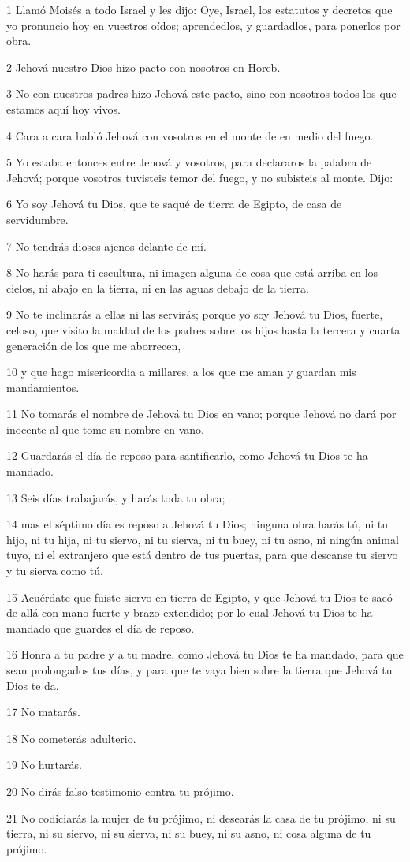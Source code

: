 \par 1 Llamó Moisés a todo Israel y les dijo: Oye, Israel, los estatutos y decretos que yo pronuncio hoy en vuestros oídos; aprendedlos, y guardadlos, para ponerlos por obra.
\par 2 Jehová nuestro Dios hizo pacto con nosotros en Horeb.
\par 3 No con nuestros padres hizo Jehová este pacto, sino con nosotros todos los que estamos aquí hoy vivos.
\par 4 Cara a cara habló Jehová con vosotros en el monte de en medio del fuego.
\par 5 Yo estaba entonces entre Jehová y vosotros, para declararos la palabra de Jehová; porque vosotros tuvisteis temor del fuego, y no subisteis al monte. Dijo:
\par 6 Yo soy Jehová tu Dios, que te saqué de tierra de Egipto, de casa de servidumbre.
\par 7 No tendrás dioses ajenos delante de mí.
\par 8 No harás para ti escultura, ni imagen alguna de cosa que está arriba en los cielos, ni abajo en la tierra, ni en las aguas debajo de la tierra.
\par 9 No te inclinarás a ellas ni las servirás; porque yo soy Jehová tu Dios, fuerte, celoso, que visito la maldad de los padres sobre los hijos hasta la tercera y cuarta generación de los que me aborrecen,
\par 10 y que hago misericordia a millares, a los que me aman y guardan mis mandamientos.
\par 11 No tomarás el nombre de Jehová tu Dios en vano; porque Jehová no dará por inocente al que tome su nombre en vano.
\par 12 Guardarás el día de reposo para santificarlo, como Jehová tu Dios te ha mandado. 
\par 13 Seis días trabajarás, y harás toda tu obra;
\par 14 mas el séptimo día es reposo a Jehová tu Dios; ninguna obra harás tú, ni tu hijo, ni tu hija, ni tu siervo, ni tu sierva, ni tu buey, ni tu asno, ni ningún animal tuyo, ni el extranjero que está dentro de tus puertas, para que descanse tu siervo y tu sierva como tú.
\par 15 Acuérdate que fuiste siervo en tierra de Egipto, y que Jehová tu Dios te sacó de allá con mano fuerte y brazo extendido; por lo cual Jehová tu Dios te ha mandado que guardes el día de reposo.
\par 16 Honra a tu padre y a tu madre, como Jehová tu Dios te ha mandado, para que sean prolongados tus días, y para que te vaya bien sobre la tierra que Jehová tu Dios te da.
\par 17 No matarás. 
\par 18 No cometerás adulterio.
\par 19 No hurtarás. 
\par 20 No dirás falso testimonio contra tu prójimo.
\par 21 No codiciarás la mujer de tu prójimo, ni desearás la casa de tu prójimo, ni su tierra, ni su siervo, ni su sierva, ni su buey, ni su asno, ni cosa alguna de tu prójimo.

